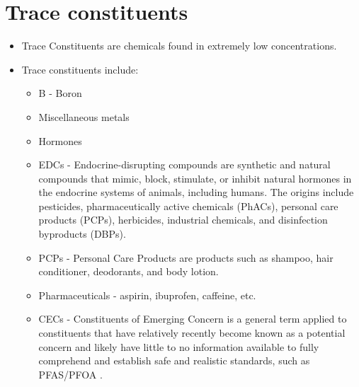 \section{Trace constituents} 
\begin{itemize}
\item Trace Constituents are chemicals found in extremely low concentrations.
\item Trace constituents include:
\begin{itemize}
\item B - Boron
\item Miscellaneous metals
\item Hormones
\item EDCs - Endocrine-disrupting compounds are synthetic and natural compounds that mimic, block, stimulate, or inhibit natural hormones in the endocrine systems of animals, including humans. The origins include pesticides, pharmaceutically active chemicals (PhACs), personal care products (PCPs), herbicides, industrial chemicals, and disinfection byproducts (DBPs).
\item PCPs - Personal Care Products are products such as shampoo, hair conditioner, deodorants, and body lotion.
\item Pharmaceuticals - aspirin, ibuprofen, caffeine, etc.
\item CECs - Constituents of Emerging Concern is a general term applied to constituents that have relatively recently become known as a potential concern and likely have little to no information available to fully comprehend and establish safe and realistic standards, such as PFAS/PFOA .
\end{itemize}
\end{itemize}

